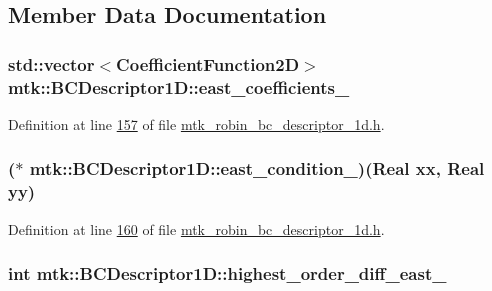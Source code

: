 \subsection{Member Data Documentation}
\hypertarget{classmtk_1_1BCDescriptor1D_af29b1f07614f7fc05032b0be8838fe7b}{
\subsubsection[{east\+\_\+coefficients\+\_\+}]{\setlength{\rightskip}{0pt plus 5cm}std\+::vector$<${\bf Coefficient\+Function2\+D}$>$ mtk\+::\+B\+C\+Descriptor1\+D\+::east\+\_\+coefficients\+\_\+}}\label{classmtk_1_1BCDescriptor1D_af29b1f07614f7fc05032b0be8838fe7b}


Definition at line \hyperlink{mtk__robin__bc__descriptor__1d_8h_source_l00157}{157} of file \hyperlink{mtk__robin__bc__descriptor__1d_8h_source}{mtk\+\_\+robin\+\_\+bc\+\_\+descriptor\+\_\+1d.\+h}.

\hypertarget{classmtk_1_1BCDescriptor1D_a828e318e90b255e2ebf0ad7495e4fe32}{
\subsubsection[{east\+\_\+condition\+\_\+}]{($\ast$ mtk\+::\+B\+C\+Descriptor1\+D\+::east\+\_\+condition\+\_\+)({\bf Real} xx, {\bf Real} yy)}}\label{classmtk_1_1BCDescriptor1D_a828e318e90b255e2ebf0ad7495e4fe32}


Definition at line \hyperlink{mtk__robin__bc__descriptor__1d_8h_source_l00160}{160} of file \hyperlink{mtk__robin__bc__descriptor__1d_8h_source}{mtk\+\_\+robin\+\_\+bc\+\_\+descriptor\+\_\+1d.\+h}.

\hypertarget{classmtk_1_1BCDescriptor1D_a8a1190eb88ba70e1e98b0905e11631db}{
\subsubsection[{highest\+\_\+order\+\_\+diff\+\_\+east\+\_\+}]{\setlength{\rightskip}{0pt plus 5cm}int mtk\+::\+B\+C\+Descriptor1\+D\+::highest\+\_\+order\+\_\+diff\+\_\+east\+\_\+}}\label{classmtk_1_1BCDescriptor1D_a8a1190eb88ba70e1e98b0905e11631db}


